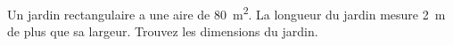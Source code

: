 %
%
    Un jardin rectangulaire a une aire de \SI{80}{\meter\squared}. La longueur du jardin mesure \SI{2}{\meter} de plus que sa largeur. Trouvez les dimensions du jardin.
